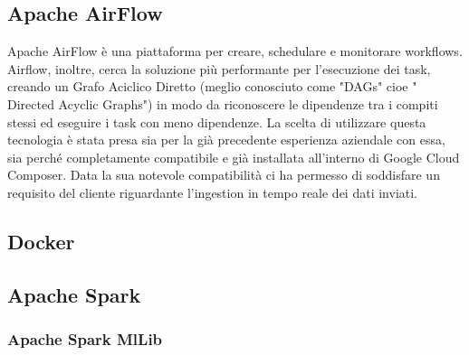 \subsection{Apache AirFlow}
Apache AirFlow \cite{ApacheAirFlow} è una piattaforma per creare, schedulare e monitorare \gls{workflows}. Airflow, inoltre, cerca la soluzione più performante per l'esecuzione dei task, creando un Grafo Aciclico Diretto (meglio conosciuto come "\gls{DAGs}" cioe " Directed Acyclic Graphs") in modo da riconoscere le dipendenze tra i compiti stessi ed eseguire i task con meno dipendenze.
La scelta di utilizzare questa tecnologia è stata presa sia per la già precedente esperienza aziendale con essa, sia perché completamente compatibile e già installata all'interno di Google Cloud Composer. Data la sua notevole compatibilità ci ha permesso di soddisfare un requisito del cliente riguardante l'ingestion in tempo reale dei dati inviati.
\subsection{Docker}
\subsection{Apache Spark}
\subsubsection{Apache Spark MlLib}
